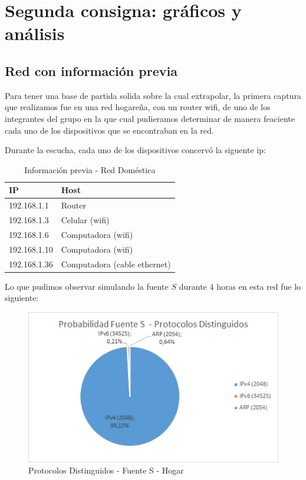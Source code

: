 \section{Segunda consigna: gráficos y análisis}

\subsection{Red con información previa}

Para tener una base de partida solida sobre la cual extrapolar, la primera captura que realizamos fue en una red hogareña, con un router wifi, de uno de los integrantes del grupo en la que cual pudieramos determinar de manera feaciente cada uno de los dispositivos que se encontraban en la red.

Durante la escucha, cada uno de los dispositivos concervó la siguente ip:\\
\begin{table}[htb]
\begin{center}
\begin{tabular}{|l|l|}
\hline
IP & Host \\
\hline \hline
192.168.1.1 & Router \\ \hline
192.168.1.3 & Celular (wifi) \\ \hline
192.168.1.6 & Computadora (wifi)  \\ \hline
192.168.1.10 & Computadora (wifi) \\ \hline
192.168.1.36 & Computadora (cable ethernet) \\ \hline
\end{tabular}
\caption{Información previa - Red Doméstica}
\label{tabla informacion}
\end{center}
\end{table}


Lo que pudimos observar simulando la fuente $S$ durante $4$ horas en esta red fue lo siguiente:\\


\begin{figure}[h!]
\centering
\includegraphics[width=\textwidth]{./img/probaS_casa.jpg}
\caption{Protocolos Distinguidos - Fuente S - Hogar}
\end{figure}
\newpage

